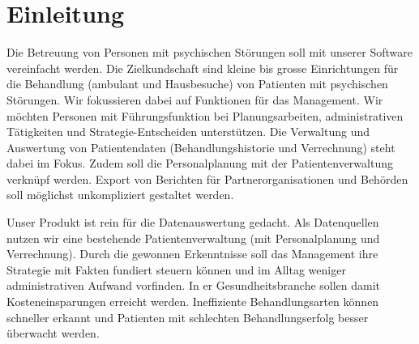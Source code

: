 \documentclass[a4paper]{scrreprt}
\begin{document}



\chapter{Einleitung}

Die Betreuung von Personen mit psychischen Störungen soll mit unserer Software vereinfacht werden. Die Zielkundschaft sind kleine bis grosse Einrichtungen für die Behandlung (ambulant und Hausbesuche) von Patienten mit psychischen Störungen. Wir fokussieren dabei auf Funktionen für das Management. Wir möchten Personen mit Führungsfunktion bei Planungsarbeiten, administrativen Tätigkeiten und Strategie-Entscheiden unterstützen. Die Verwaltung und Auswertung von Patientendaten (Behandlungshistorie und Verrechnung) steht dabei im Fokus. Zudem soll die Personalplanung mit der Patientenverwaltung verknüpf werden. Export von Berichten für Partnerorganisationen und Behörden soll möglichst unkompliziert gestaltet werden.

\bigskip

Unser Produkt ist rein für die Datenauswertung gedacht. Als Datenquellen nutzen wir eine bestehende Patientenverwaltung (mit Personalplanung und Verrechnung). Durch die gewonnen Erkenntnisse soll das Management ihre Strategie mit Fakten fundiert steuern können und im Alltag weniger administrativen Aufwand vorfinden. In er Gesundheitsbranche sollen damit Kosteneinsparungen erreicht werden. Ineffiziente Behandlungsarten können schneller erkannt und Patienten mit schlechten Behandlungserfolg besser überwacht werden.
\end{document}

